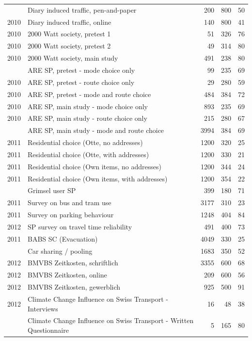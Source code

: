 \documentclass[a4paper]{article}\usepackage[]{graphicx}\usepackage[]{xcolor}
\begin{document}
\begin{landscape}
\begin{longtable}[t]{rlrrr}
\addlinespace
2010 & Diary induced traffic, pen-and-paper & 200 & 800 & 50\\
2010 & Diary induced traffic, online & 140 & 800 & 41\\
2010 & 2000 Watt society, pretest 1 & 51 & 326 & 76\\
2010 & 2000 Watt society, pretest 2 & 49 & 314 & 80\\
2010 & 2000 Watt society, main study & 491 & 238 & 80\\
\addlinespace
2010 & ARE SP, pretest - mode choice only & 99 & 235 & 69\\
2010 & ARE SP, pretest - route choice only & 29 & 280 & 59\\
2010 & ARE SP, pretest - mode and route choice & 484 & 384 & 72\\
2010 & ARE SP, main study - mode choice only & 893 & 235 & 69\\
2010 & ARE SP, main study - route choice only & 215 & 280 & 67\\
\addlinespace
2010 & ARE SP, main study - mode and route choice & 3994 & 384 & 69\\
2011 & Residential choice (Otte, no addresses) & 1200 & 320 & 25\\
2011 & Residential choice (Otte, with addresses) & 1200 & 330 & 21\\
2011 & Residential choice (Own items, no addresses) & 1200 & 344 & 24\\
2011 & Residential choice (Own items, with addresses) & 1200 & 354 & 22\\
\addlinespace
2011 & Grimsel user SP & 399 & 180 & 71\\
2011 & Survey on bus and tram use & 3177 & 310 & 23\\
2011 & Survey on parking behaviour & 1248 & 404 & 84\\
2012 & SP survey on travel time reliability & 491 & 400 & 73\\
2011 & BABS SC (Evacuation) & 4049 & 330 & 25\\
\addlinespace
2012 & Car sharing / pooling & 1683 & 350 & 52\\
2012 & BMVBS Zeitkosten, schriftlich & 3355 & 600 & 68\\
2012 & BMVBS Zeitkosten, online & 209 & 600 & 56\\
2012 & BMVBS Zeitkosten, gewerblich & 925 & 500 & 91\\
2012 & Climate Change Influence on Swiss Transport - Interviews & 16 & 48 & 38\\
\addlinespace
2013 & Climate Change Influence on Swiss Transport - Written Questionnaire & 5 & 165 & 80\\

\end{longtable}
\end{landscape}
\end{document}
